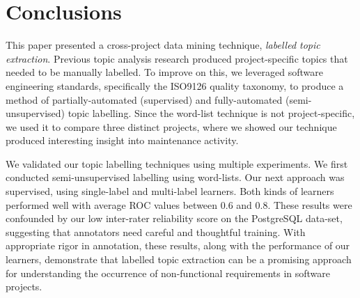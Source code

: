 \documentclass[smallextended]{svjour3}       %
\begin{document}
\section{Conclusions}
This paper presented a cross-project data mining technique,
\emph{labelled topic extraction}. %
Previous topic analysis research produced project-specific
topics that needed to be manually labelled.
To improve on this, we leveraged software engineering standards,
specifically the ISO9126 quality taxonomy, to produce a method of partially-automated (supervised) and fully-automated (semi-unsupervised) topic labelling.
Since the word-list technique is not project-specific, we used it to compare three distinct projects, where we showed our technique produced interesting
insight into maintenance activity. %


We validated our topic labelling techniques using multiple experiments. %
We first conducted semi-unsupervised labelling using word-lists. 
Our next approach was supervised, using single-label and multi-label learners. 
Both kinds of learners performed well with average
ROC values between $0.6$ and $0.8$. 
These results were confounded by our low inter-rater reliability score
on the PostgreSQL data-set, suggesting that annotators need careful
and thoughtful training.
With appropriate rigor in annotation, these results, along with the performance of our learners,
demonstrate that labelled topic extraction can be
a promising approach for understanding the occurrence of non-functional requirements in software projects. 
\end{document}
